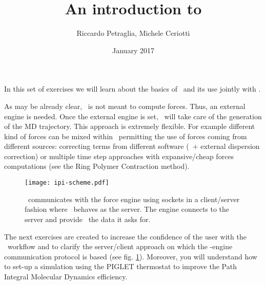 \documentclass{article}
\title{An introduction to \ipi{}}
\author{Riccardo Petraglia, Michele Ceriotti}
\date{January 2017}
\begin{document}
\maketitle

In this set of exercises we will learn about the basics of \ipi\ and
its use jointly with \qe.  

As may be already clear, \ipi\ is not meant to compute forces. Thus,
an external engine is needed. Once the external engine is set, \ipi\
will take care of the generation of the MD trajectory. This approach
is extremely flexible. For example different kind of forces can be
mixed within \ipi\ permitting the use of forces coming from different
sources: correcting terms from different software (\PWscf~+ external
dispersion correction) or multiple time step approaches with
expansive/cheap forces computations (see the Ring Polymer Contraction
method).

\begin{figure}[h!]
\centering
\texttt{[image: ipi-scheme.pdf]}
\caption{\ipi\ communicates with the force engine using sockets in a
  client/server fashion where \ipi\ behaves as the server. The engine
  connects to the server and provide \ipi\ the data it asks
  for.}\label{fig:ipi-scheme}
\end{figure}


The next exercises are created to increase the confidence of the user
with the \ipi\ workflow and to clarify the server/client approach on
which the \ipi-engine communication protocol is based (see
fig. \ref{fig:ipi-scheme}). Moreover, you will understand how to
set-up a simulation using the PIGLET thermostat to improve the Path
Integral Molecular Dynamics efficiency.
\end{document}
